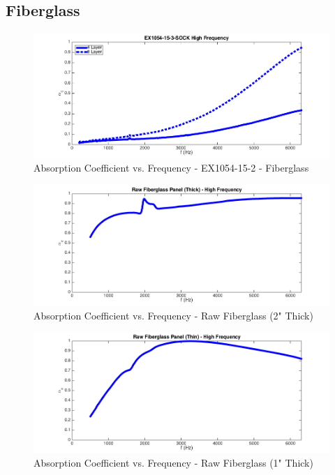 \subsection{Fiberglass}
\begin{figure}[hbtp]
    \centering
    \includegraphics[width=1\textwidth]{Chapter-4/figs/AfigSOCK15-3}
    \caption{Absorption Coefficient vs. Frequency - EX1054-15-2 - Fiberglass}
    \label{fig:AfigSOCK15-3}
\end{figure}

\begin{figure}[hbtp]
    \centering
    \includegraphics[width=1\textwidth]{Chapter-4/figs/RawFiberglassThick}
    \caption{Absorption Coefficient vs. Frequency - Raw Fiberglass (2" Thick)}
    \label{fig:RawFiberglassThick}
\end{figure}

\begin{figure}[hbtp]
    \centering
    \includegraphics[width=1\textwidth]{Chapter-4/figs/RawFiberglassThin}
    \caption{Absorption Coefficient vs. Frequency - Raw Fiberglass (1" Thick)}
    \label{fig:RawFiberglassThin}
\end{figure}
\clearpage

